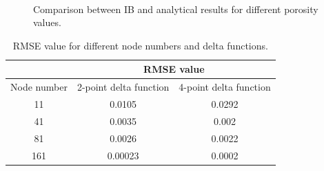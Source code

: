 \begin{figure}[H]
{	}
	\quad
	\\
	\quad
	\caption{Comparison between IB and analytical results for different porosity values.}
	\label{fig:C3_classicalIBResultNodeNumber}
\end{figure}

\begin{table}[H]
\centering
\begin{tabular}{c | c | c}
	  & \multicolumn{2}{c}{RMSE value} \\ \hline
	 Node number & 2-point delta function & 4-point delta function \\ \hline \hline
	 11 & 0.0105 & 0.0292 \\ \hline
	 41 & 0.0035 & 0.002 \\ \hline
	 81 & 0.0026 & 0.0022 \\ \hline
	 161 & 0.00023 & 0.0002 \\
\end{tabular}
\caption{RMSE value for different node numbers and delta functions.}
\label{table:C3_classicalIBResultNodeNumberRMSE}
\end{table}


